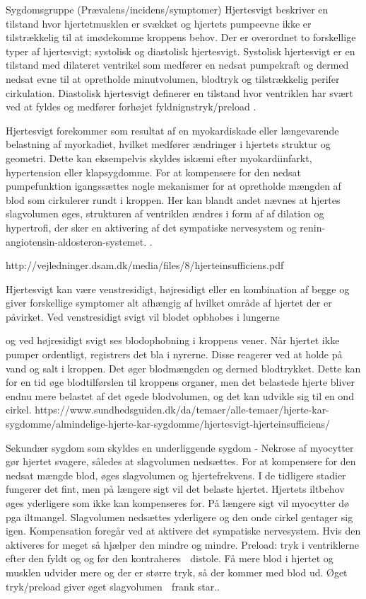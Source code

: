 Sygdomsgruppe (Prævalens/incidens/symptomer)
Hjertesvigt beskriver en tilstand hvor hjertetmusklen er svækket  og hjertets pumpeevne ikke er tilstrækkelig til at imødekomme kroppens behov. Der er overordnet to forskellige typer af hjertesvigt; systolisk og diastolisk hjertesvigt. Systolisk hjertesvigt er en tilstand med dilateret ventrikel som medfører en nedsat pumpekraft og dermed nedsat evne til at opretholde minutvolumen, blodtryk og tilstrækkelig perifer cirkulation. Diastolisk hjertesvigt definerer en tilstand hvor ventriklen har svært ved at fyldes og medfører forhøjet fyldnignstryk/preload \cite{Basis}. 

Hjertesvigt forekommer som resultat af en myokardiskade eller længevarende belastning af myorkadiet, hvilket medfører ændringer i hjertets struktur og geometri. Dette kan eksempelvis skyldes iskæmi efter myokardiinfarkt, hypertension eller klapsygdomme\cite{almenMedicin}.  For at kompensere for den nedsat pumpefunktion igangssættes nogle mekanismer for at opretholde mængden af blod som cirkulerer rundt i kroppen. Her kan blandt andet nævnes at hjertes slagvolumen øges, strukturen af ventriklen ændres i form af af dilation og hypertrofi, der sker en aktivering af det sympatiske nervesystem og renin-angiotensin-aldosteron-systemet. \cite{Basis}. 

http://vejledninger.dsam.dk/media/files/8/hjerteinsufficiens.pdf

Hjertesvigt kan være venstresidigt, højresidigt eller en kombination af begge og giver forskellige symptomer alt afhængig af hvilket område af hjertet der er påvirket. Ved venstresidigt svigt vil blodet opbhobes i lungerne 


og ved højresidigt svigt ses blodophobning i kroppens vener. Når hjertet ikke pumper ordentligt, registrers det bla i nyrerne. Disse reagerer ved at holde på vand og salt i kroppen. Det øger blodmængden og dermed blodtrykket. Dette kan for en tid øge blodtilførslen til kroppens organer, men det belastede hjerte bliver endnu mere belastet af det øgede blodvolumen, og det kan udvikle sig til en ond cirkel. https://www.sundhedsguiden.dk/da/temaer/alle-temaer/hjerte-kar-sygdomme/almindelige-hjerte-kar-sygdomme/hjertesvigt-hjerteinsufficiens/ 




Sekundær sygdom som skyldes en underliggende sygdom
-	Nekrose af myocytter gør hjertet svagere, således at slagvolumen nedsættes. 
For at kompensere for den nedsat mængde blod, øges slagvolumen og hjertefrekvens. I de tidligere stadier fungerer det fint, men på længere sigt vil det belaste hjertet.  Hjertets iltbehov øges yderligere som ikke kan kompenseres for. På længere sigt vil myocytter dø pga iltmangel. Slagvolumen nedsættes yderligere og den onde cirkel gentager sig igen. 
Kompensation foregår ved at aktivere det sympatiske nervesystem. Hvis den aktiveres for meget så hjælper den mindre og mindre. 
Preload: tryk i ventriklerne efter den fyldt og og før den kontraheres  distole. Få mere blod i hjertet og musklen udvider mere og der er større tryk, så der kommer med blod ud. Øget tryk/preload giver øget slagvolumen  frank star..

